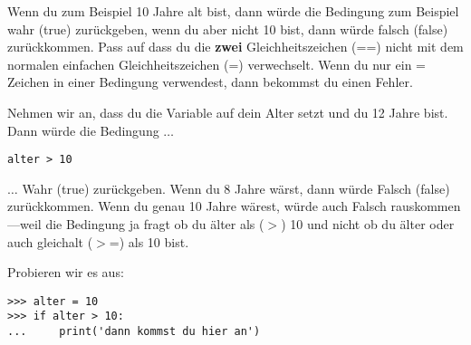 Wenn du zum Beispiel 10 Jahre alt bist, dann würde die Bedingung  zum Beispiel wahr (true) zurückgeben, wenn du aber nicht 10 bist, dann würde falsch (false) zurückkommen. Pass auf dass du die \textbf{zwei} Gleichheitszeichen (==) nicht mit dem normalen einfachen Gleichheitszeichen (=) verwechselt. Wenn du nur ein = Zeichen in einer Bedingung verwendest, dann bekommst du einen Fehler.
\par
Nehmen wir an, dass du die Variable  auf dein Alter setzt und du 12 Jahre bist. Dann würde die Bedingung \texorpdfstring{$\ldots$}{...}

\begin{Verbatim}[frame=single]
alter > 10
\end{Verbatim}

\texorpdfstring{$\ldots$}{...} Wahr (true) zurückgeben. Wenn du 8 Jahre wärst, dann würde Falsch (false) zurückkommen. Wenn du genau 10 Jahre wärest, würde auch Falsch rauskommen---weil die Bedingung ja fragt ob du älter als ($>$) 10 und nicht ob du älter oder auch gleichalt ($>$=) als 10 bist.

Probieren wir es aus:

\begin{Verbatim}[frame=single]
>>> alter = 10
>>> if alter > 10:
...     print('dann kommst du hier an')
\end{Verbatim}


